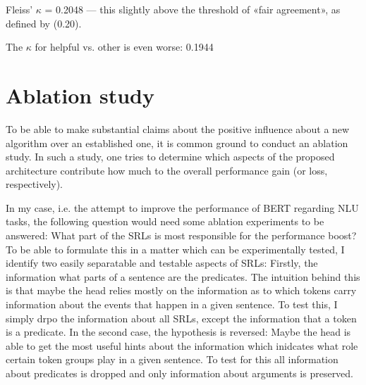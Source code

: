 


Fleiss' $\kappa$ = 0.2048 --- this slightly above the threshold of «fair agreement», as defined by \citep{landis1977measurement} (0.20).

The $\kappa$ for helpful vs. other is even worse: 0.1944

\section{Ablation study}
\label{sec:ablation}

To be able to make substantial claims about the positive influence about a new algorithm over an
established one, it is common ground to conduct an ablation study. In such a study, one tries to
determine which aspects of the proposed architecture contribute how much to the overall performance
gain (or loss, respectively).

In my case, i.e. the attempt to improve the performance of BERT regarding NLU tasks, the
following question would need some ablation experiments to be answered: What part of the
SRLs is most responsible for the performance boost? To be able to formulate this in a
matter which can be experimentally tested, I identify two easily separatable and testable
aspects of SRLs: Firstly, the information what parts of a sentence are the predicates.
The intuition behind this is that maybe the head relies mostly on the information as to
which tokens carry information about the events that happen in a given sentence. To test
this, I simply drpo the information about all SRLs, except the information that a token
is a predicate. In the second case, the hypothesis is reversed: Maybe the head is able to
get the most useful hints about the information which inidcates what role certain token
groups play in a given sentence. To test for this all information about predicates is
dropped and only information about arguments is preserved.

